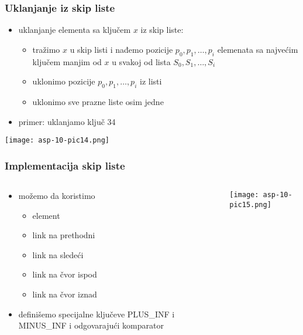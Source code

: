 \documentclass[compress]{beamer}
\begin{document}
\begin{frame}[fragile]
  \frametitle{Uklanjanje iz skip liste}
  \begin{itemize}
    \item uklanjanje elementa sa ključem $x$ iz skip liste:
    \begin{itemize}
      \item tražimo $x$ u skip listi i nađemo pozicije $p_0, p_1, \ldots, p_i$ elemenata sa najvećim ključem manjim od $x$ u svakoj od lista $S_0, S_1, \ldots, S_i$
      \item uklonimo pozicije $p_0, p_1, \ldots, p_i$ iz listi
      \item uklonimo sve prazne liste osim jedne
    \end{itemize}
    \item primer: uklanjamo ključ 34 
  \end{itemize}
  \begin{center}
    \texttt{[image: asp-10-pic14.png]}
  \end{center}
\end{frame}

\begin{frame}[fragile]
  \frametitle{Implementacija skip liste}
  \begin{columns}
    \begin{column}[c]{6cm}
      \begin{itemize}
        \item možemo da koristimo 
        \begin{itemize}
          \item element
          \item link na prethodni
          \item link na sledeći
          \item link na čvor ispod
          \item link na čvor iznad
        \end{itemize}
        \item definišemo specijalne ključeve {\tiny PLUS\_INF} i {\tiny MINUS\_INF} i odgovarajući komparator 
      \end{itemize}
    \end{column}
    \begin{column}[c]{6cm}
      \begin{center}
        \texttt{[image: asp-10-pic15.png]}
      \end{center}
    \end{column}
  \end{columns}
\end{frame}
\end{document}
